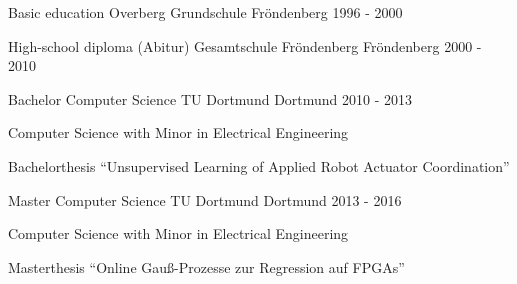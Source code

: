

\begin{cventries}

  \cventry
    {Basic education} %
    {Overberg Grundschule} %
    {Fröndenberg} %
    {1996 - 2000} %
    {
    }

    \cventry
    {High-school diploma (Abitur)} %
    {Gesamtschule Fröndenberg} %
    {Fröndenberg} %
    {2000 - 2010} %
    {
    }

    \cventry
    {Bachelor Computer Science} %
    {TU Dortmund} %
    {Dortmund} %
    {2010 - 2013} %
    {
        \begin{cvitems} %
            \item Computer Science with Minor in Electrical Engineering
            \item Bachelorthesis ``Unsupervised Learning of Applied Robot Actuator Coordination''
        \end{cvitems}
    }

    \cventry
    {Master Computer Science} %
    {TU Dortmund} %
    {Dortmund} %
    {2013 - 2016} %
    {
        \begin{cvitems} %
            \item Computer Science with Minor in Electrical Engineering
            \item Masterthesis ``Online Gau{\ss}-Prozesse zur Regression auf FPGAs''
        \end{cvitems}
    }

\end{cventries}

